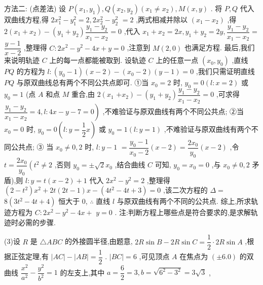 方法二: (点差法) 设 $P\left( {{x}_{1},{y}_{1}}\right) ,Q\left( {{x}_{2},{y}_{2}}\right) \left( {{x}_{1} \neq  {x}_{2}}\right) ,M\left( {x,y}\right)$ . 将 $P,Q$ 代入双曲线方程,得 $2{x}_{1}^{2} - {y}_{1}^{2} = 2,2{x}_{2}^{2} - {y}_{2}^{2}$  $= 2$ ,两式相减并除以 $\left( {{x}_{1} - {x}_{2}}\right)$ ,得 $2\left( {{x}_{1} + {x}_{2}}\right)  - \left( {{y}_{1} + {y}_{2}}\right) \dfrac{{y}_{1} - {y}_{2}}{{x}_{1} - {x}_{2}} = 0$ ,代入 ${x}_{1} + {x}_{2} = {2x},{y}_{1} + {y}_{2} = {2y},\dfrac{{y}_{1} - {y}_{2}}{{x}_{1} - {x}_{2}} =$  $\dfrac{y - 1}{x - 2}$ ,整理得 $C : 2{x}^{2} - {y}^{2} - {4x} + y = 0$ ,注意到 $M\left( {2,0}\right)$ 也满足方程. 最后,我们来说明轨迹 $C$ 上的每一点都能被取到. 设轨迹 $C$ 上的任意一点 $\left( {{x}_{0},{y}_{0}}\right)$ ,直线 ${PQ}$ 的方程为 $l : \left( {{y}_{0} - 1}\right) \left( {x - 2}\right)  - \left( {{x}_{0} - 2}\right) \left( {y - 1}\right)  = 0$ ,我们只需证明直线 ${PQ}$ 与原双曲线总有两个不同公共点即可. ①当 ${x}_{0} = 2$ 时, ${y}_{0} = 0\left( {l : x = 2}\right)$ 或 ${y}_{0} = 1$ (点 $A$ 和点 $M$ 重合,由 $2\left( {x}_{1}\right.$  $\left. {+{x}_{2}}\right)  - \left( {{y}_{1} + {y}_{2}}\right) \dfrac{{y}_{1} - {y}_{2}}{{x}_{1} - {x}_{2}} = 0$ ,可求得 $\left. {\dfrac{{y}_{1} - {y}_{2}}{{x}_{1} - {x}_{2}} = 4,l : {4x} - y - 7 = 0}\right)$ ,不难验证与原双曲线有两个不同公共点; ②当 ${x}_{0} = 0$ 时, ${y}_{0} = 0\left( {l : y = \dfrac{1}{2}x}\right)$ 或 ${y}_{0} = 1\left( {l : y = 1}\right)$ ,不难验证与原双曲线有两个不同公共点; ③ 当 ${x}_{0} \neq  0,2$ 时, $l : y - 1$  $= \dfrac{{y}_{0} - 1}{{x}_{0} - 2}\left( {x - 2}\right)  = \dfrac{2{x}_{0}}{{y}_{0}}\left( {x - 2}\right)$ ,令 $t = \dfrac{2{x}_{0}}{{y}_{0}}\left( {{t}^{2} \neq  2}\right.$ ,否则 ${y}_{0} =  \pm  \sqrt{2}{x}_{0}$ ,结合曲线 $C$ 可知, ${y}_{0} = {x}_{0} = 0$ ,与 ${x}_{0} \neq  0,2$ 矛盾),则 $l : y = t\left( {x - 2}\right)  + 1$ 代入 $2{x}^{2} - {y}^{2} = 2$ ,整理得 $\left( {2 - {t}^{2}}\right) {x}^{2} + {2t}\left( {{2t} - 1}\right) x - \left( {4{t}^{2} - {4t} + 3}\right)  = 0$ ,该二次方程的 $\Delta  =$  $8\left( {3{t}^{2} - {4t} + 4}\right)$ 恒大于 0, $\therefore$ 直线 $l$ 与原双曲线有两个不同的公共点. 综上,所求轨迹方程为 $C : 2{x}^{2} - {y}^{2} - {4x} +$  $y = 0$ . 注:判断方程上哪些点是符合要求的,是求解轨迹时必需的步骤.

(3)设 $R$ 是 $\bigtriangleup  {ABC}$ 的外接圆半径,由题意, ${2R}\sin B - {2R}\sin C = \dfrac{1}{2} \cdot  {2R}\sin A$ ,根据正弦定理,有 $\left| {AC}\right|  - \left| {AB}\right|  = \dfrac{1}{2}$ . $\left| {BC}\right|  = 6$ ,可见顶点 $A$ 在焦点为 $\left( {\pm {6.0}}\right)$ 的双曲线 $\dfrac{{x}^{2}}{{a}^{2}} - \dfrac{{y}^{2}}{{b}^{2}} = 1$ 的左支上,其中 $a = \dfrac{6}{2} = 3,b = \sqrt{{6}^{2} - {3}^{2}} = 3\sqrt{3}$ ,

